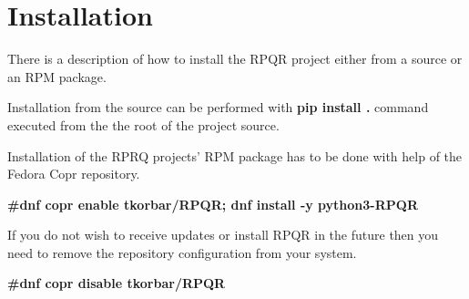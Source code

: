 \chapter{Installation}

There is a description of how to install the RPQR project either from a source or an RPM package.


Installation from the source can be performed with \textbf{pip install .} command executed from the
the root of the project source.


Installation of the RPRQ projects' RPM package has to be done with help of the Fedora Copr repository.


\textbf{\#dnf copr enable tkorbar/RPQR; dnf install -y python3-RPQR}


If you do not wish to receive updates or install RPQR in the future then you need to remove the
repository configuration from your system.


\textbf{\#dnf copr disable tkorbar/RPQR}

